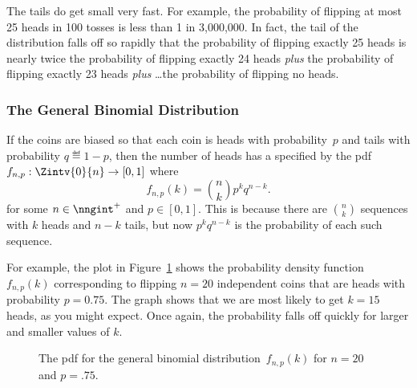 The tails do get small very fast.  For example, the probability of
flipping at most 25 heads in 100 tosses is less than 1 in 3,000,000.
In fact, the tail of the distribution falls off so rapidly that the
probability of flipping exactly 25 heads is nearly twice the
probability of flipping exactly 24 heads \emph{plus} the probability
of flipping exactly 23 heads \emph{plus} \dots the probability of
flipping no heads.

\subsubsection{The General Binomial Distribution}

If the coins are biased so that each coin is heads with
probability~$p$ and tails with probability $q \eqdef 1-p$, then the
number of heads has a 
specified by the pdf $f_{n,p} : \Zintv{0}{n} \to [0, 1]$ where
\begin{equation}\label{eq:binomfnp}
    f_{n, p}(k) = \binom{n}{k} p^k q^{n-k}.
\end{equation}
for some $n \in \nngint^+$ and $p \in [0, 1]$.  This is because
there are $\binom{n}{k}$ sequences with $k$ heads and $n - k$ tails,
but now $p^kq^{n-k}$ is the probability of each such sequence.

For example, the plot in Figure~\ref{fig:16F7} shows the probability
density function $f_{n, p}(k)$ corresponding to flipping $n=20$
independent coins that are heads with probability $p = 0.75$.  The
graph shows that we are most likely to get $k = 15$ heads, as
you might expect.  Once again, the probability falls off quickly for
larger and smaller values of $k$.
%
\begin{figure}


\caption{The pdf for the general binomial distribution~$f_{n, p}(k)$
  for $n = 20$ and $p = .75$.}

\label{fig:16F7}

\end{figure}

\iffalse
The cumulative distribution function for the general binomial
distribution is~$F_{n, p}: \reals \to [0, 1]$ where
\begin{equation}\label{eqn:16F5}
F_{n, p}(x) =
    \begin{cases}
        0 & \text{if $x < 1$} \\
        \sum_{i = 0}^k \binom{n}{i} p^i q^{n - i}
          & \text{if $k \le x < k + 1$ for $1 \le k < n$} \\
        1 & \text{if $n \le x$}.
    \end{cases}
\end{equation}
\fi

